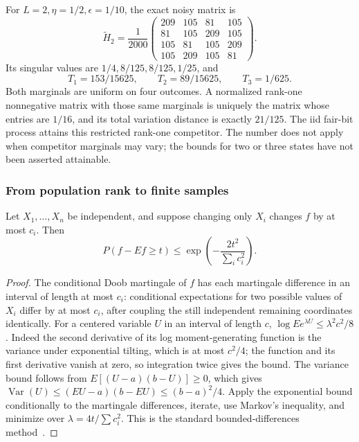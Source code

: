 For \(L=2,\eta=1/2,\epsilon=1/10\), the exact noisy matrix is
\begin{equation}\label{op:noisy-four}
 \widetilde H_2=\frac1{2000}
 \begin{pmatrix}
 209&105&81&105\\
 81&105&209&105\\
 105&81&105&209\\
 105&209&105&81
 \end{pmatrix}.
\end{equation}
Its singular values are \(1/4,8/125,8/125,1/25\), and
\[
 T_1=153/15625,\qquad T_2=89/15625,\qquad T_3=1/625.
\]
Both marginals are uniform on four outcomes.  A normalized rank-one
nonnegative matrix with those same marginals is uniquely the matrix
whose entries are \(1/16\), and its total variation distance is exactly
\(21/125\).  The iid fair-bit process attains this restricted rank-one
competitor.  The number does not apply when competitor marginals may
vary; the bounds for two or three states have not been asserted attainable.

\subsubsection{From population rank to finite samples}

\begin{lemma}\label{op:bounded}
Let \(X_1,\ldots,X_n\) be independent, and suppose changing only \(X_i\)
changes \(f\) by at most \(c_i\).  Then
\[
 P(f-Ef\ge t)\le
 \exp\left(-\frac{2t^2}{\sum_i c_i^2}\right).
\]
\end{lemma}
\begin{proof}
The conditional Doob martingale of \(f\) has each martingale difference
in an interval of length at most \(c_i\): conditional expectations for
two possible values of \(X_i\) differ by at most \(c_i\), after coupling
the still independent remaining coordinates identically.
For a centered variable \(U\) in an interval of length \(c\),
\(\log E e^{\lambda U}\le\lambda^2c^2/8\).
Indeed the second derivative of its log moment-generating function is
the variance under exponential tilting, which is at most \(c^2/4\);
the function and its first derivative vanish at zero, so integration
twice gives the bound.  The variance bound follows from
\(E[(U-a)(b-U)]\ge0\), which gives
\(\operatorname{Var}(U)\le(EU-a)(b-EU)\le(b-a)^2/4\).
Apply the exponential bound conditionally to the martingale differences,
iterate, use Markov's inequality, and minimize over
\(\lambda=4t/\sum c_i^2\).  This is the standard bounded-differences
method~\cite{op:mcdiarmid}.
\end{proof}

